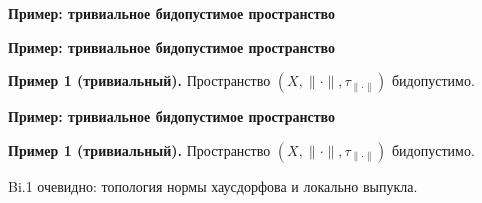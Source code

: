 \documentclass[11pt]{article}
\begin{document}
\newpage

\begin{center}
{\color{notaeYELLOW}\bfseries\fontsize{44}{52}\selectfont Пример: тривиальное бидопустимое пространство}
\end{center}
\vspace*{\fill}
\begin{center}
\fontsize{36}{43}\selectfont
\end{center}
\vspace*{\fill}

\newpage

\begin{center}
{\color{notaeYELLOW}\bfseries\fontsize{44}{52}\selectfont Пример: тривиальное бидопустимое пространство}
\end{center}
\vspace*{\fill}
\begin{center}
\fontsize{36}{43}\selectfont
\parbox{\linewidth}{\centering\noindent \textbf{Пример 1 (тривиальный).} Пространство $(X,\|\cdot\|,\tau_{\|\cdot\|})$ бидопустимо.
\par}\vspace{0.4in}
\end{center}
\vspace*{\fill}

\newpage

\begin{center}
{\color{notaeYELLOW}\bfseries\fontsize{44}{52}\selectfont Пример: тривиальное бидопустимое пространство}
\end{center}
\vspace*{\fill}
\begin{center}
\fontsize{36}{43}\selectfont
\parbox{\linewidth}{\centering\noindent \textbf{Пример 1 (тривиальный).} Пространство $(X,\|\cdot\|,\tau_{\|\cdot\|})$ бидопустимо.
\par}\vspace{0.4in}
\parbox{\linewidth}{\centering\noindent Bi.1 очевидно: топология нормы хаусдорфова и локально выпукла.
\par}\vspace{0.4in}
\end{center}
\vspace*{\fill}

\newpage
\end{document}
